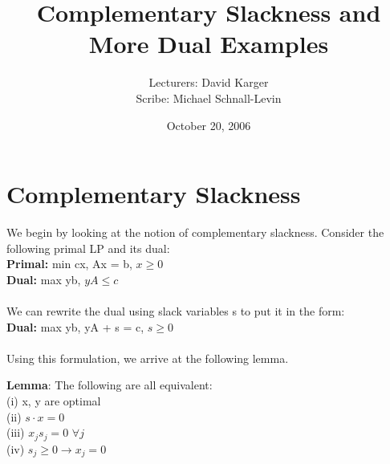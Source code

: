 \documentclass{article}
\title{Complementary Slackness and More Dual Examples}
\date{October 20, 2006}
\author{Lecturers: David Karger\\ Scribe: Michael Schnall-Levin}
\begin{document}
%
%
%
%

%


\begin{center}
\end{center}

\section{Complementary Slackness}
We begin by looking at the notion of complementary slackness.  Consider the following primal LP and its dual:\\
\textbf{Primal:} min cx, Ax = b, $x\geq 0$\\
\textbf{Dual:} max yb, $yA \leq c$\\
\\
We can rewrite the dual using slack variables s to put it in the form:\\
\textbf{Dual:} max yb, yA + s = c, $s \geq 0$\\
\\
Using this formulation, we arrive at the following lemma.

\textbf{Lemma}:
The following are all equivalent:\\
(i) x, y are optimal\\
(ii) $s\cdot x = 0$\\
(iii) $x_{j}s_{j} = 0$ $\forall j$\\
(iv) $s_{j} \geq 0 \rightarrow x_{j} = 0$
\end{document}
